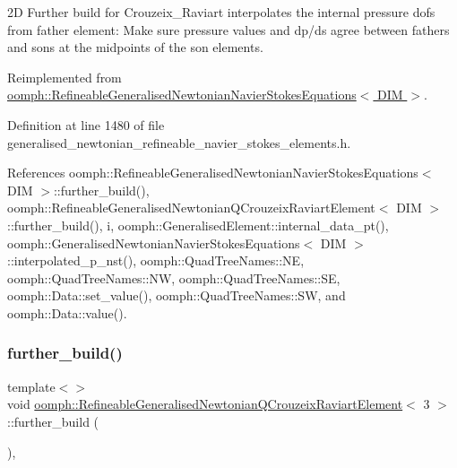 2D Further build for Crouzeix\+\_\+\+Raviart interpolates the internal pressure dofs from father element\+: Make sure pressure values and dp/ds agree between fathers and sons at the midpoints of the son elements. 

Reimplemented from \hyperlink{classoomph_1_1RefineableGeneralisedNewtonianNavierStokesEquations_a53a4c5277d517f5df48df7c1953b2b02}{oomph\+::\+Refineable\+Generalised\+Newtonian\+Navier\+Stokes\+Equations$<$ D\+I\+M $>$}.



Definition at line 1480 of file generalised\+\_\+newtonian\+\_\+refineable\+\_\+navier\+\_\+stokes\+\_\+elements.\+h.



References oomph\+::\+Refineable\+Generalised\+Newtonian\+Navier\+Stokes\+Equations$<$ D\+I\+M $>$\+::further\+\_\+build(), oomph\+::\+Refineable\+Generalised\+Newtonian\+Q\+Crouzeix\+Raviart\+Element$<$ D\+I\+M $>$\+::further\+\_\+build(), i, oomph\+::\+Generalised\+Element\+::internal\+\_\+data\+\_\+pt(), oomph\+::\+Generalised\+Newtonian\+Navier\+Stokes\+Equations$<$ D\+I\+M $>$\+::interpolated\+\_\+p\+\_\+nst(), oomph\+::\+Quad\+Tree\+Names\+::\+NE, oomph\+::\+Quad\+Tree\+Names\+::\+NW, oomph\+::\+Quad\+Tree\+Names\+::\+SE, oomph\+::\+Data\+::set\+\_\+value(), oomph\+::\+Quad\+Tree\+Names\+::\+SW, and oomph\+::\+Data\+::value().

\mbox{\label{classoomph_1_1RefineableGeneralisedNewtonianQCrouzeixRaviartElement_ab6ba5ac30da8e91baa12c59d7805f6e5}} 
\subsubsection{\texorpdfstring{further\+\_\+build()}{further\_build()}\hspace{0.1cm}{\footnotesize\ttfamily [3/3]}}
{\footnotesize\ttfamily template$<$$>$ \\
void \hyperlink{classoomph_1_1RefineableGeneralisedNewtonianQCrouzeixRaviartElement}{oomph\+::\+Refineable\+Generalised\+Newtonian\+Q\+Crouzeix\+Raviart\+Element}$<$ 3 $>$\+::further\+\_\+build (\begin{DoxyParamCaption}{ }\end{DoxyParamCaption})\hspace{0.3cm}{\ttfamily [inline]}, {\ttfamily [virtual]}}

